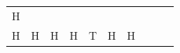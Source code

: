 {\begin{tabular}[t]{|l|l|l|l|l|l|l|l|l|l|}
    
        H%
     \tabularnewline\cline{1-1}\cline{2-2}\cline{3-3}\cline{4-4}\cline{5-5}\cline{6-6}\cline{7-7}\cline{8-8}\cline{9-9}\cline{10-10}
    
    
        H &
    
    
        H &
    
    
        H &
    
    
        H &
    
    
        T &
    
    
        H &
    
    
        H &
    
    

\end{tabular}}
